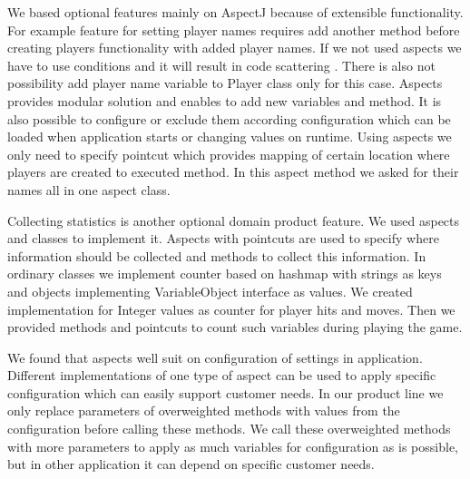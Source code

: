 \documentclass[11pt,english,a4paper,twoside]{article}
\begin{document}
We based optional features mainly on AspectJ because of extensible functionality. For example feature for setting player names requires add another method before creating players functionality with added player names. If we not used aspects we have to use conditions and it will result in code scattering \cite{laddad_aspectj_2003}. There is also not possibility add player name variable to Player class only for this case. Aspects provides modular solution and enables to add new variables and method. It is also possible to configure or exclude them according configuration which can be loaded when application starts or changing values on runtime. Using aspects we only need to specify pointcut which provides mapping of certain location where players are created  to executed method. In this aspect method we asked for their names all in one aspect class. 

Collecting statistics is another optional domain product feature. We used aspects and classes to implement it. Aspects with pointcuts are used to specify where information should be collected and methods to collect this information. In ordinary classes we implement counter based on hashmap with strings as keys and objects implementing VariableObject interface as values. We created implementation for Integer values as counter for player hits and moves. Then we provided methods and pointcuts to count such variables during playing the game. 

We found that aspects well suit on configuration of settings in application. Different implementations of one type of aspect can be used to apply specific configuration which can easily support customer needs. In our product line we only replace parameters of overweighted methods with values from the configuration before calling these methods. We call these overweighted methods with more parameters to apply as much variables for configuration as is possible, but in other application it can depend on specific customer needs. 
\end{document}
